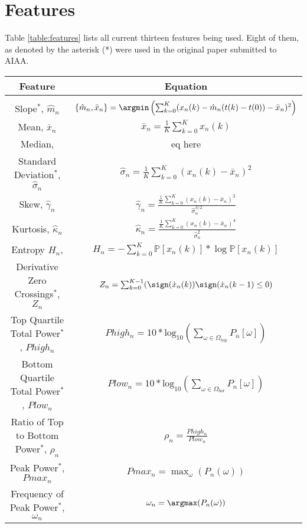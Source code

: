 \section{Features}

Table \ref{table:features} lists all current thirteen features being used. Eight of
them, as denoted by the asterisk (*) were used in the original paper
submitted to AIAA. 

\begin{table*}[t]
\caption{Feature Set} %
\centering %
\begin{tabular}{c c} %
\hline\hline %
Feature & Equation \\ [0.5ex] %
\hline \\ [0.5ex] %
Slope$^*$, $\hat{m}_n$ & $\{\hat{m}_n, \bar{x}_n\} =
\argmin\left(\sum_{k=0}^{K}
(x_n(k)-\hat{m}_n(t(k)-t(0))-\bar{x}_n)^2\right) $ \\ [1ex] %
Mean, $\bar{x}_n$ & $\bar{x}_n = \frac{1}{K} \sum_{k=0}^{K} x_n(k)$ \\ [1ex]

Median,  & eq here \\ [1ex]

Standard Deviation$^*$, $\hat{\sigma}_n$ & $\hat{\sigma}_n = \frac{1}{K}
\sum_{k=0}^{K} (x_n(k)-\bar{x}_n)^2 $ \\ [1ex]

Skew, $\hat{\gamma}_n$ & $\hat{\gamma}_n = \frac{\frac{1}{K}
\sum_{k=0}^{K} (x_n(k)-\bar{x}_n)^3}{\hat{\sigma}_n^{3/2}} $ \\ [1ex]

Kurtosis, $\hat{\kappa}_n$ & $\hat{\kappa}_n = \frac{\frac{1}{K}
  \sum_{k=0}^{K} (x_n(k)-\bar{x}_n)^4}{\hat{\sigma}_n^2} $ \\ [1ex]

Entropy $H_n$, & $H_n = - \sum_{k=0}^{K} \mathbb{P}[x_n(k)] * \log \mathbb{P}[x_n(k)]$ \\ [1ex] 

Derivative Zero Crossings$^*$, $Z_n$ & $Z_n = \sum_{k=0}^{K-1} (\sign(\dot{x}_n(k))\sign(\dot{x}_n(k-1) \leq 0) $ \\ [1ex] 
Top Quartile Total Power$^*$, $Phigh_n$  & $Phigh_n = 10*\text{log}_{10}(\sum_{\omega\in\Omega_{top}} P_n[\omega])  $ \\ [1ex] 
Bottom Quartile Total Power$^*$, $Plow_n$  & $Plow_n = 10*\text{log}_{10}(\sum_{\omega\in\Omega_{bot}} P_n[\omega])  $ \\ [1ex] 
Ratio of Top to Bottom Power$^*$, $\rho_n$  & $\rho_n = \frac{Phigh_n}{Plow_n}  $ \\ [1ex]  %
Peak Power$^*$, $Pmax_n$ & $Pmax_n = \max_\omega(P_n(\omega))$  \\ [1ex]
Frequency of Peak Power$^*$, $\omega_n$ & $\omega_n = \argmax(P_n(\omega))$  \\ [1ex]
\hline %
\end{tabular}
\label{table:features} %
\end{table*}

